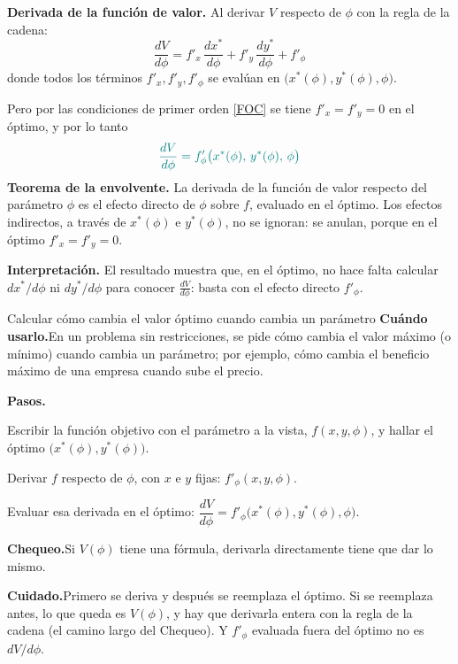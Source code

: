 \documentclass{article}
\newcommand{\rotulo}[2][principal]{\textsf{\bfseries\color{#1}#2}\enspace}
\begin{document}
\textbf{Derivada de la función de valor.} Al derivar \(V\) respecto de \(\phi\) con la regla de la cadena:
\[
\frac{dV}{d\phi}
= f'_x\,\frac{dx^*}{d\phi}
+ f'_y\,\frac{dy^*}{d\phi}
+ f'_\phi
\]
donde todos los términos \(f'_x,f'_y,f'_\phi\) se evalúan en \(\bigl(x^*(\phi),y^*(\phi),\phi\bigr)\).

Pero por las condiciones de primer orden \eqref{FOC} se tiene \(f'_x=f'_y=0\) en el óptimo, y por lo tanto
\[
\color{teal}
\frac{dV}{d\phi}=f'_\phi\bigl(x^*(\phi),\,y^*(\phi),\,\phi\bigr)
\]
{\color{teal}\textbf{Teorema de la envolvente.}} La derivada de la función de valor respecto del parámetro \(\phi\) es el efecto directo de \(\phi\) sobre \(f\), evaluado en el óptimo. Los efectos indirectos, a través de \(x^*(\phi)\) e \(y^*(\phi)\), no se ignoran: se anulan, porque en el óptimo \(f'_x=f'_y=0\).

\textbf{Interpretación.} El resultado muestra que, en el óptimo, no hace falta calcular \(dx^*/d\phi\) ni \(dy^*/d\phi\) para conocer \(\tfrac{dV}{d\phi}\): basta con el efecto directo \(f'_\phi\).

\begin{metodo}[label=met:envolvente]{Calcular cómo cambia el valor óptimo cuando cambia un parámetro}
\rotulo{Cuándo usarlo.}En un problema sin restricciones, se pide cómo cambia el valor máximo (o mínimo) cuando cambia un parámetro; por ejemplo, cómo cambia el beneficio máximo de una empresa cuando sube el precio.

\rotulo{Pasos.}
\begin{pasos}
  \item Escribir la función objetivo con el parámetro a la vista, \(f(x,y,\phi)\), y hallar el óptimo \(\bigl(x^*(\phi),y^*(\phi)\bigr)\).
  \item Derivar \(f\) respecto de \(\phi\), con \(x\) e \(y\) fijas: \(f'_\phi(x,y,\phi)\).
  \item Evaluar esa derivada en el óptimo: \(\dfrac{dV}{d\phi}=f'_\phi\bigl(x^*(\phi),y^*(\phi),\phi\bigr)\).
\end{pasos}

\rotulo{Chequeo.}Si \(V(\phi)\) tiene una fórmula, derivarla directamente tiene que dar lo mismo.

\rotulo[oxido]{Cuidado.}Primero se deriva y después se reemplaza el óptimo. Si se reemplaza antes, lo que queda es \(V(\phi)\), y hay que derivarla entera con la regla de la cadena (el camino largo del Chequeo). Y \(f'_\phi\) evaluada fuera del óptimo no es \(dV/d\phi\).
\end{metodo}
\end{document}
